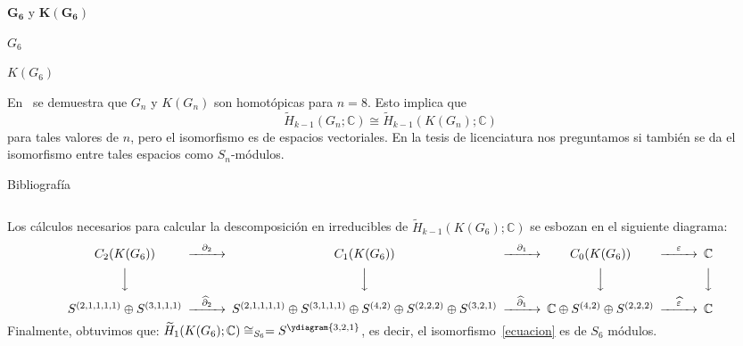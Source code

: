\documentclass[final,xcolor=svgnames]{beamer}
\begin{document}
\begin{frame}{}
\begin{columns}
\begin{column}{0.5\textwidth}
\begin{block}{$\boldsymbol{G_6}$ y $\boldsymbol{K(G_6)}$}
\begin{minipage}{0.53\linewidth}
    $G_{6}$
  \end{minipage}
  \begin{minipage}{0.4\linewidth}  
    \centering   

    $K(G_{6})$
  \end{minipage}
\end{block}

\begin{block}{}
  En~\cite{chessboard-graphs} se demuestra que $G_{n}$ y $K(G_{n})$
  son homotópicas para $n=8$. Esto implica que
  \begin{equation}
    \label{ecuacion}
    \widetilde H_{k-1}(G_{n};\mathbb{C})\cong \widetilde H_{k-1}(K(G_{n});\mathbb{C})
  \end{equation}
  para tales valores de $n$, pero el isomorfismo es de espacios
  vectoriales. En la tesis de licenciatura nos preguntamos si también
  se da el isomorfismo entre tales espacios \alert{como $S_{n}$-módulos}.
\end{block}

\begin{block}{Bibliografía}
  
  
\end{block}
\end{column}
\end{columns}

  \vfill

  \begin{block}{}
    Los cálculos necesarios para calcular la descomposición en
    irreducibles de $\widetilde H_{k-1}(K(G_{6});\mathbb{C})$ se esbozan
    en el siguiente diagrama:
    \[
    \begin{CD}
      C_{2}(K(G_{6})) @>{\partial_{2}}>> C_{1}(K(G_{6})) @>{\partial_{1}}>> C_{0}(K(G_{6})) @>{\varepsilon}>> \mathbb{C}\\
      @VVV   @VVV   @VVV   @VVV    \\
      S^{(2,1,1,1,1)}\oplus S^{(3,1,1,1)} @>{\widehat\partial_{2}}>>
      S^{(2,1,1,1,1)}\oplus S^{(3,1,1,1)}\oplus S^{(4,2)}\oplus S^{(2,2,2)}\oplus S^{(3,2,1)} @>{\widehat\partial_{1}}>> 
      \mathbb{C} \oplus S^{(4,2)}\oplus S^{(2,2,2)} @>{\widehat \varepsilon}>>  \mathbb{C}
    \end{CD}
    \]
    Finalmente, obtuvimos que: $\widetilde
    H_{1}(K(G_{6});\mathbb{C})\cong_{S_{6}}=S^{\ydiagram{3,2,1}}$, es
    decir, el isomorfismo~\ref{ecuacion} es de $S_{6}$ módulos.
  \end{block}
\end{frame}
\end{document}
